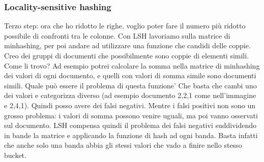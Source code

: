 \subsubsection{Locality-sensitive hashing}
Terzo step: ora che ho ridotto le righe, voglio poter fare il numero più ridotto possibile di confronti tra le colonne. Con LSH lavoriamo sulla matrice di minhashing, per poi andare ad utilizzare una funzione che candidi delle coppie. Creo dei gruppi di documenti che possibilmente sono coppie di elementi simili. Come li trovo? Ad esempio potrei calcolare la somma nella matrice di minhashing  dei valori di ogni documento, e quelli con valori di somma simile sono documenti simili. Quale può essere il problema di questa funzione' Che basta che cambi uno dei valori e categorizza diverso (ad esempio documento 2,2,1 come nell'immagine e 2,4,1). Quindi posso avere dei falsi negativi. Mentre i falsi positivi non sono un grosso problema:  i valori di somma possono venire uguali, ma poi vanno osservati sul documento. LSH compensa quindi il problema dei falsi negativi suddividendo in bande la matrice e applicando la funzione di hash ad ogni banda. Basta infatti che anche solo una banda abbia gli stessi valori che vado a finire nello stesso bucket. 

\newpage

